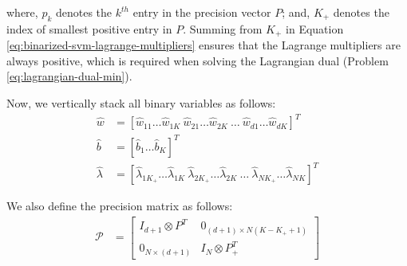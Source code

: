\documentclass[12pt]{article}
\numberwithin{equation}{section}
\begin{document}
where, $p_k$ denotes the $k^{th}$ entry in the precision vector $P$;
and, $K_+$ denotes the index of smallest positive entry in $P$.
Summing from $K_+$ in Equation \ref{eq:binarized-svm-lagrange-multipliers} ensures that the Lagrange multipliers are always positive, which is required when solving the Lagrangian dual (Problem \ref{eq:lagrangian-dual-min}).

Now, we vertically stack all binary variables as follows:
\begin{align}
    \hat{w} &= [\hat{w}_{11} \ldots \hat{w}_{1K} \ \hat{w}_{21} \ldots \hat{w}_{2K} \ \ldots \ \hat{w}_{d1} \ldots \hat{w}_{dK} ]^T \label{eq:w-hat} \\
    \hat{b} &= [\hat{b}_{1} \ldots \hat{b}_K]^T \label{eq:b-hat} \\
    \hat{\lambda} &= [\hat{\lambda}_{1K_+} \ldots \hat{\lambda}_{1K} \ \hat{\lambda}_{2K_+} \ldots \hat{\lambda}_{2K} \ \ldots \ \hat{\lambda}_{NK_+} \ldots \hat{\lambda}_{NK} ]^T \label{eq:lambda-hat}
\end{align}

We also define the precision matrix as follows:
\begin{align}
    \mathcal{P} &=  \begin{bmatrix}
                        I_{d+1} \otimes P^T     & 0_{(d+1) \times N (K - K_+ + 1)} \\
                        0_{N \times (d + 1)}    & I_N \otimes P_+^T
                    \end{bmatrix} \label{eq:precision-matrix}
\end{align}
\end{document}

